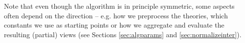 Note that even though the algorithm is in principle symmetric, some aspects often depend on the direction -- e.g. how we preprocess the theories,	which constants we use as starting points or how we aggregate and evaluate the resulting (partial) views (see Sections \ref{sec:algparams} and \ref{sec:normalizeinter}).


